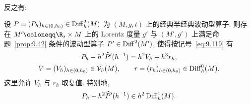 反之有:

\begin{proposition}[半经典波动型算子的刻画]\label{prop:9.43}
设 $P = (P_h)_{h \in (0, h_0)} \in \operatorname{Diff}_h^2(M)$ 为 $(M, g, t)$ 上的经典半经典波动型算子. 则存在 $M' \defeq \R_s \times M$ 上的 Lorentz 度量 $g'$ 与 $(M', g')$ 上满足命题~\ref{prop:9.42} 条件的波动型算子 $P' \in \operatorname{Diff}^2(M')$, 使得按记号~\eqref{eq:9.119} 有
\begin{equation}\label{eq:9.127}
    \begin{gathered}
        P_h - h^2 \widehat{P}'(h^{-1}) = h^2 V_h + h^3 r_h, \\
        V = (V_h)_{h \in (0, h_0)} \in \mathcal{V}_h(M), \qquad r = (r_h)_{h \in (0, h_0)} \in \operatorname{Diff}_h^0(M).
    \end{gathered}
\end{equation}
这里允许 $V_h$ 与 $r_h$ 取复值. 特别地,
\begin{equation}\label{eq:9.128}
    P_h - h^2 \widehat{P}'(h^{-1}) \in h^2 \operatorname{Diff}_h^1(M).
\end{equation}
\end{proposition}

